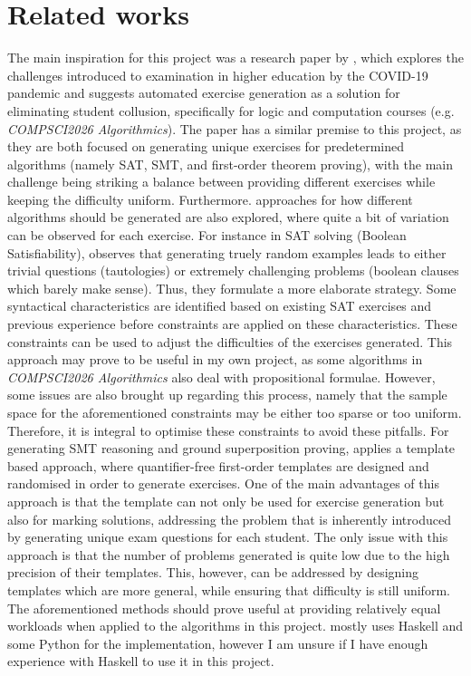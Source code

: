 \documentclass{l4proj}
\begin{document}
\section{Related works}
The main inspiration for this project was a research paper by \citet{Hoz21}, which explores the challenges introduced to examination in higher education by the COVID-19 pandemic and suggests  automated exercise generation as a solution for eliminating student collusion, specifically for logic and computation courses (e.g. \emph{COMPSCI2026 Algorithmics}). The paper has a similar premise to this project, as they are both focused on generating unique exercises for predetermined algorithms (namely SAT, SMT, and first-order theorem proving), with the main challenge being striking a balance between providing different exercises while keeping the difficulty uniform. Furthermore. approaches for how different algorithms should be generated are also explored, where quite a bit of variation can be observed for each exercise. For instance in SAT solving (Boolean Satisfiability), \citet{Hoz21} observes that generating truely random examples leads to either trivial questions (tautologies) or extremely challenging problems (boolean clauses which barely make sense). Thus, they formulate a more elaborate strategy. Some syntactical characteristics are identified based on existing SAT exercises and previous experience before constraints are applied on these characteristics. These constraints can be used to adjust the difficulties of the exercises generated. This approach may prove to be useful in my own project, as some algorithms in \emph{COMPSCI2026 Algorithmics} also deal with propositional formulae. However, some issues are also brought up regarding this process, namely that the sample space for the aforementioned constraints may be either too sparse or too uniform. Therefore, it is integral to optimise these constraints to avoid these pitfalls. For generating SMT reasoning and ground superposition proving, \citet{Hoz21} applies a template based approach, where quantifier-free first-order templates are designed and randomised in order to generate exercises. One of the main advantages of this approach is that the template can not only be used for exercise generation but also for marking solutions, addressing the problem that is inherently introduced by generating unique exam questions for each student. The only issue with this approach is that the number of problems generated is quite low due to the high precision of their templates. This, however, can be addressed by designing templates which are more general, while ensuring that difficulty is still uniform. The aforementioned methods should prove useful at providing relatively equal workloads when applied to the algorithms in this project. \citet{Hoz21} mostly uses Haskell and some Python for the implementation, however I am unsure if I have enough experience with Haskell to use it in this project.
\end{document}
